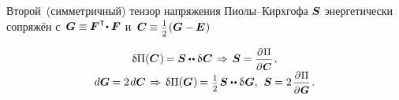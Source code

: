 \begin{otherlanguage}{russian}
Второй~(симметричный) тензор напряжения Пиолы--Кирх\-гофа $\bm{S}$ энергетически сопряжён с~${\bm{G} \equiv \hspace{-0.1ex} \bm{F}^{\hspace{.1ex}\T} \hspace{-0.4ex} \dotp \bm{F}}$ и~${\bm{C} \hspace{-0.1ex} \equiv \smalldisplaystyleonehalf \hspace{.1ex} (\bm{G} - \hspace{-0.12ex} \bm{E} \hspace{.1ex})}$

\nopagebreak\vspace{-0.4em}\begin{equation}
\begin{array}{c}
\variation{\Pi}(\bm{C}\hspace{.1ex}) \hspace{-0.2ex} = \secondpiolakirchhoffstress \dotdotp \variation{\hspace{.1ex} \bm{C}}
\hspace{.25ex} \Rightarrow \hspace{.32ex}
\secondpiolakirchhoffstress = \scalebox{0.92}{$ \displaystyle \frac{\partial \hspace{.1ex} \Pi}{\raisemath{-0.1em}{\partial \hspace{.1ex} \bm{C}}} $} \hspace{.24ex} , \\[.5em]
%
d\bm{G} \hspace{-0.12ex} = 2 \hspace{.2ex} d \bm{C}
\hspace{.25ex} \Rightarrow \hspace{.32ex}
\variation{\Pi}(\bm{G}\hspace{.1ex}) \hspace{-0.2ex} = \hspace{.1ex} \smalldisplaystyleonehalf \hspace{.2ex} \secondpiolakirchhoffstress \dotdotp \variation{\hspace{.1ex} \bm{G}} ,
\:\,
\secondpiolakirchhoffstress \hspace{-0.1ex} = 2 \hspace{.25ex} \scalebox{0.92}{$ \displaystyle \frac{\partial \hspace{.1ex} \Pi}{\raisemath{-0.1em}{\partial \hspace{.1ex} \bm{G}}} $} \hspace{.25ex}.
\end{array}
\end{equation}


\end{otherlanguage}
